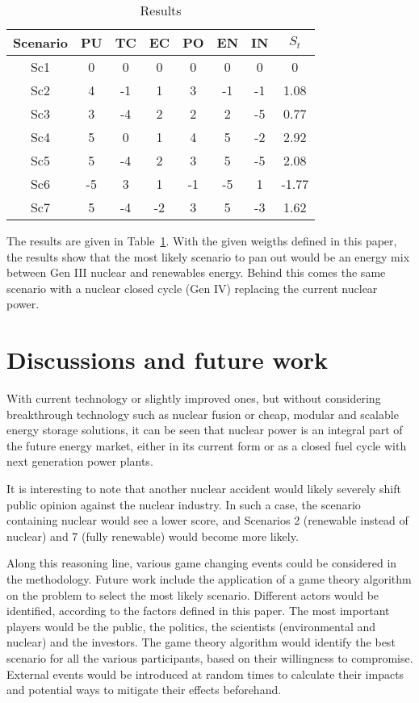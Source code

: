 \documentclass[IJPHM, 2017, 29]{PHMSociety}
\begin{document}
\begin{table}[]
\centering
\caption{Results}
\label{tab3}
\begin{tabular}{|c|c|c|c|c|c|c|c|}
\hline
Scenario & PU & TC & EC & PO & EN & IN & $S_t$ \\ \hline
Sc1      & 0  & 0  & 0  & 0  & 0  & 0  & 0     \\ \hline
Sc2      & 4  & -1 & 1  & 3  & -1 & -1 & 1.08  \\ \hline
Sc3      & 3  & -4 & 2  & 2  & 2  & -5 & 0.77  \\ \hline
Sc4      & 5  & 0  & 1  & 4  & 5  & -2 & 2.92  \\ \hline
Sc5      & 5  & -4 & 2  & 3  & 5  & -5 & 2.08  \\ \hline
Sc6      & -5 & 3  & 1  & -1 & -5 & 1  & -1.77 \\ \hline
Sc7      & 5  & -4 & -2 & 3  & 5  & -3 & 1.62  \\ \hline
\end{tabular}
\end{table}


The results are given in Table~\ref{tab3}. With the given weigths defined in this paper, the results show that the most likely scenario to pan out would be an energy mix between Gen III nuclear and renewables energy. Behind this comes the same scenario with a nuclear closed cycle (Gen IV) replacing the current nuclear power.

\section{Discussions and future work}
\label{sec:fut}
With current technology or slightly improved ones, but without considering breakthrough technology such as nuclear fusion or cheap, modular and scalable energy storage solutions, it can be seen that nuclear power is an integral part of the future energy market, either in its current form or as a closed fuel cycle with next generation power plants.

It is interesting to note that another nuclear accident would likely severely shift public opinion against the nuclear industry. In such a case, the scenario containing nuclear would see a lower score, and Scenarios 2 (renewable instead of nuclear) and 7 (fully renewable) would become more likely.

Along this reasoning line, various game changing events could be considered in the methodology. Future work include the application of a game theory algorithm on the problem to select the most likely scenario. Different actors would be identified, according to the factors defined in this paper. The most important players would be the public, the politics, the scientists (environmental and nuclear) and the investors. The game theory algorithm would identify the best scenario for all the various participants, based on their willingness to compromise. External events would be introduced at random times to calculate their impacts and potential ways to mitigate their effects beforehand.
\end{document}
